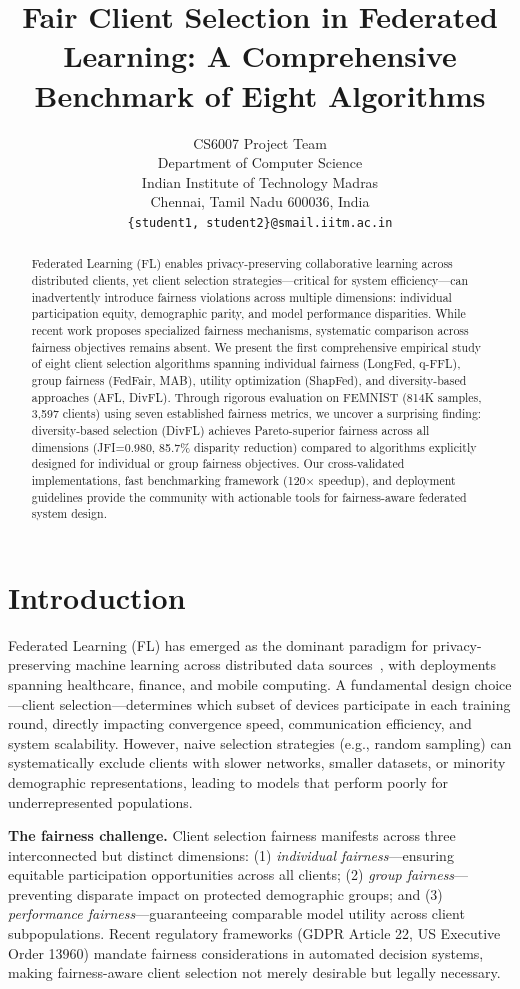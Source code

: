 \documentclass{article}
\title{Fair Client Selection in Federated Learning: A Comprehensive Benchmark of Eight Algorithms}
\author{
  CS6007 Project Team \\
  Department of Computer Science\\
  Indian Institute of Technology Madras\\
  Chennai, Tamil Nadu 600036, India \\
  \texttt{\{student1, student2\}@smail.iitm.ac.in}
}
\begin{document}
\maketitle

\begin{abstract}
Federated Learning (FL) enables privacy-preserving collaborative learning across distributed clients, yet client selection strategies—critical for system efficiency—can inadvertently introduce fairness violations across multiple dimensions: individual participation equity, demographic parity, and model performance disparities. While recent work proposes specialized fairness mechanisms, systematic comparison across fairness objectives remains absent. We present the first comprehensive empirical study of eight client selection algorithms spanning individual fairness (LongFed, q-FFL), group fairness (FedFair, MAB), utility optimization (ShapFed), and diversity-based approaches (AFL, DivFL). Through rigorous evaluation on FEMNIST (814K samples, 3,597 clients) using seven established fairness metrics, we uncover a surprising finding: diversity-based selection (DivFL) achieves Pareto-superior fairness across all dimensions (JFI=0.980, 85.7\% disparity reduction) compared to algorithms explicitly designed for individual or group fairness objectives. Our cross-validated implementations, fast benchmarking framework (120$\times$ speedup), and deployment guidelines provide the community with actionable tools for fairness-aware federated system design.
\end{abstract}

\section{Introduction}

Federated Learning (FL) has emerged as the dominant paradigm for privacy-preserving machine learning across distributed data sources~\cite{mcmahan2017fedavg}, with deployments spanning healthcare, finance, and mobile computing. A fundamental design choice—client selection—determines which subset of devices participate in each training round, directly impacting convergence speed, communication efficiency, and system scalability. However, naive selection strategies (e.g., random sampling) can systematically exclude clients with slower networks, smaller datasets, or minority demographic representations, leading to models that perform poorly for underrepresented populations.

\textbf{The fairness challenge.} Client selection fairness manifests across three interconnected but distinct dimensions: (1) \emph{individual fairness}—ensuring equitable participation opportunities across all clients; (2) \emph{group fairness}—preventing disparate impact on protected demographic groups; and (3) \emph{performance fairness}—guaranteeing comparable model utility across client subpopulations. Recent regulatory frameworks (GDPR Article 22, US Executive Order 13960) mandate fairness considerations in automated decision systems, making fairness-aware client selection not merely desirable but legally necessary.
\end{document}
